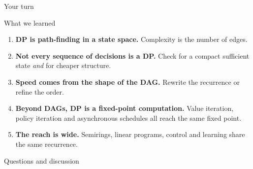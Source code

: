 \begin{frame}{Your turn}
\end{frame}

\begin{frame}{What we learned}
	\begin{enumerate}
		\item \textbf{DP is path-finding in a state space.} Complexity is the number of edges.
		\item \textbf{Not every sequence of decisions is a DP.} Check for a compact sufficient state \emph{and} for cheaper structure.
		\item \textbf{Speed comes from the shape of the DAG.} Rewrite the recurrence or refine the order.
		\item \textbf{Beyond DAGs, DP is a fixed-point computation.} Value iteration, policy iteration and asynchronous schedules all reach the same fixed point.
		\item \textbf{The reach is wide.} Semirings, linear programs, control and learning share the same recurrence.
	\end{enumerate}
\end{frame}

\begin{frame}
	Questions and discussion
\end{frame}

\appendix

